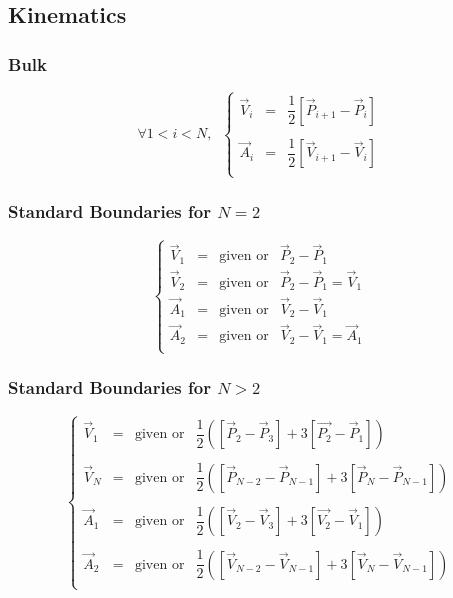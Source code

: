 \documentclass[aps,12pt]{revtex4}
\begin{document}
\subsection{Kinematics}

\subsubsection{Bulk}

\begin{equation}
\forall 1 < i < N, \;\;
\left\lbrace
\begin{array}{rcl}
	\vec{V}_i & = & \dfrac{1}{2} \left[ \vec{P}_{i+1} - \vec{P}_i\right]\\
	\\
	\vec{A}_i & = & \dfrac{1}{2} \left[ \vec{V}_{i+1} - \vec{V}_i\right]\\
\end{array}
\right.
\end{equation}

\subsubsection{Standard Boundaries for $N=2$}
\begin{equation}
\left\lbrace
\begin{array}{rcll}
\vec{V}_1 & = & \text{given or} & \vec{P}_2 - \vec{P}_1\\ 
\vec{V}_2 & = & \text{given or} & \vec{P}_2 - \vec{P}_1 = \vec{V}_1\\
\vec{A}_1 & = & \text{given or} & \vec{V}_2 - \vec{V}_1\\ 
\vec{A}_2 & = & \text{given or} & \vec{V}_2 - \vec{V}_1=\vec{A}_1\\ 
\end{array} 
\right.
\end{equation}

\subsubsection{Standard Boundaries for $N>2$}
\begin{equation}
\left\lbrace
\begin{array}{rcll}
\vec{V}_1 & = & \text{given or} & \dfrac{1}{2}\left( \left[\vec{P}_2 - \vec{P}_3\right] + 3\left[\vec{P_2}-\vec{P}_1\right] \right)\\ 
\\
\vec{V}_N & = & \text{given or} & \dfrac{1}{2}\left( \left[\vec{P}_{N-2}-\vec{P}_{N-1}\right]  + 3\left[\vec{P}_{N} - \vec{P}_{N-1}\right] \right)\\
\\
\vec{A}_1 & = & \text{given or} &  \dfrac{1}{2}\left( \left[\vec{V}_2 - \vec{V}_3\right] + 3\left[\vec{V_2}-\vec{V}_1\right] \right)\\ 
\\
\vec{A}_2 & = & \text{given or} &  \dfrac{1}{2}\left( \left[\vec{V}_{N-2}-\vec{V}_{N-1}\right]  + 3\left[\vec{V}_{N} - \vec{V}_{N-1}\right] \right)\\ 
\end{array}
\right.
\end{equation}
\end{document}
